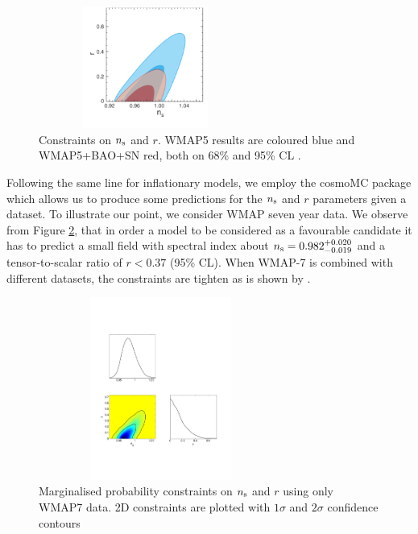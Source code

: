\documentclass{rmaa}
\begin{document}
\begin{figure}[h!]
\begin{center}
 \includegraphics[trim = 1mm 10mm -10mm -3mm, clip, width=7cm, height=4cm]{komatsu1.pdf}
\caption{Constraints on $n_{\rm s}$ and $r$.
WMAP5 results are coloured blue and WMAP5+BAO+SN red, both on 68\% and 95\% CL \citep{Komatsu}.
}\label{fig:Komatsu}
\end{center}
\end{figure}

Following the same line for inflationary models, we employ the {\sc cosmoMC} package \citep{Lewis}
which allows us to produce some predictions for the $n_{\rm s}$ and $r$ parameters given 
a dataset. To illustrate our point, we consider WMAP seven year data. 
We observe from Figure \ref{fig:infla}, that in order a 
model to be considered as a favourable candidate 
it has to predict a small field with spectral index about  $n_{\rm s}=0.982^{+0.020}_{-0.019}$ 
 and a tensor-to-scalar ratio of $r<0.37$ (95\% CL).
When WMAP-7 is combined with different datasets, the constraints are tighten as is 
shown by \citep{Larson}. 



\begin{figure}[h!]
\begin{center}
 \includegraphics[trim = 10mm 50mm 20mm 40mm, clip, width=8cm, height=6cm]{infla_wmap7.pdf}
\caption{Marginalised probability constraints on $n_{\rm s}$ and $r$ using only WMAP7 data. 
2D constraints are plotted with $1\sigma$ and
$2\sigma$ confidence contours
}\label{fig:infla}
\end{center}
\end{figure}	
\end{document}
